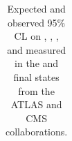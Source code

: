 \begin{table}
{\begin{tabular}{|c|c|c|c|c|c|c|c|}
\end{tabular}
}
\caption{Expected and observed 95\% CL on \hthreeg, \hthreez, \hfourg, and \hfourz\; measured in the 
\Zgllg\; and \Zgvvg\; final states from the ATLAS and CMS collaborations.}
\label{tab:sss-Vgamma-ATGC}
\end{table}





